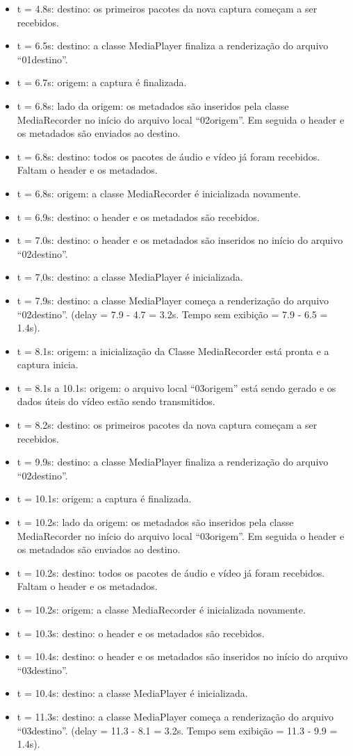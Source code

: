 \documentclass{acm_proc_article-sp}
\begin{document}
\begin{itemize}
 \item t = 4.8s: destino: os primeiros pacotes da nova captura começam a ser recebidos.
 \item t = 6.5s: destino: a classe MediaPlayer finaliza a renderização do arquivo “01destino”.
 \item t = 6.7s: origem: a captura é finalizada.
 \item t = 6.8s: lado da origem: os metadados são inseridos pela classe MediaRecorder no início do arquivo local “02origem”. Em seguida o header e os metadados são enviados ao destino.
 \item t = 6.8s: destino: todos os pacotes de áudio e vídeo já foram recebidos. Faltam o header e os metadados.
 \item t = 6.8s: origem: a classe MediaRecorder é inicializada novamente.
 \item t = 6.9s: destino: o header e os metadados são recebidos.
 \item t = 7.0s: destino: o header e os metadados são inseridos no início do arquivo “02destino”.
 \item t = 7,0s: destino: a classe MediaPlayer é inicializada.
 \item t = 7.9s: destino: a classe MediaPlayer começa a renderização do arquivo “02destino”. (delay = 7.9 - 4.7 = 3.2s. Tempo sem exibição = 7.9 - 6.5 = 1.4s).
 \item t = 8.1s: origem: a inicialização da Classe MediaRecorder está pronta e a captura inicia.
 \item t = 8.1s a 10.1s: origem: o arquivo local “03origem” está sendo gerado e os dados úteis do vídeo estão sendo transmitidos.
 \item t = 8.2s: destino: os primeiros pacotes da nova captura começam a ser recebidos.
 \item t = 9.9s: destino: a classe MediaPlayer finaliza a renderização do arquivo “02destino”.
 \item t = 10.1s: origem: a captura é finalizada.
 \item t = 10.2s: lado da origem: os metadados são inseridos pela classe MediaRecorder no início do arquivo local “03origem”. Em seguida o header e os metadados são enviados ao destino.
 \item t = 10.2s: destino: todos os pacotes de áudio e vídeo já foram recebidos. Faltam o header e os metadados.
 \item t = 10.2s: origem: a classe MediaRecorder é inicializada novamente.
 \item t = 10.3s: destino: o header e os metadados são recebidos.
 \item t = 10.4s: destino: o header e os metadados são inseridos no início do arquivo “03destino”.
 \item t = 10.4s: destino: a classe MediaPlayer é inicializada.
 \item t = 11.3s: destino: a classe MediaPlayer começa a renderização do arquivo “03destino”. (delay = 11.3 - 8.1 = 3.2s. Tempo sem exibição = 11.3 - 9.9 = 1.4s).
\end{itemize}
\end{document}
